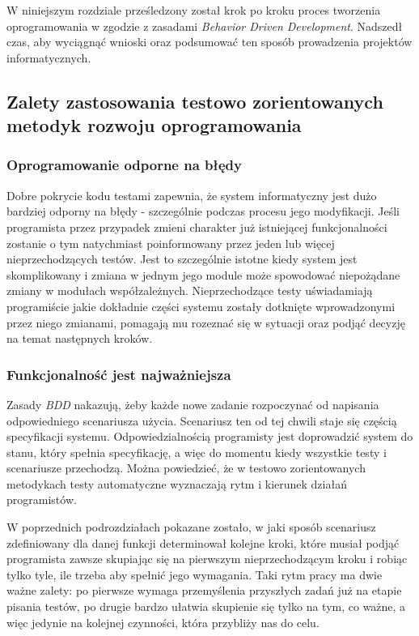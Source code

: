   W niniejszym rozdziale prześledzony został krok po kroku proces tworzenia oprogramowania w zgodzie z zasadami \emph{Behavior Driven Development}. Nadszedł czas, aby wyciągnąć wnioski oraz podsumować ten sposób prowadzenia projektów informatycznych.
  
  \subsection{Zalety zastosowania testowo zorientowanych metodyk rozwoju oprogramowania}
  
  \subsubsection{Oprogramowanie odporne na błędy}
    Dobre pokrycie kodu testami zapewnia, że system informatyczny jest dużo bardziej odporny na błędy - szczególnie podczas procesu jego modyfikacji. Jeśli programista przez przypadek zmieni charakter już istniejącej funkcjonalności zostanie o tym natychmiast poinformowany przez jeden lub więcej nieprzechodzących testów. Jest to szczególnie istotne kiedy system jest skomplikowany i zmiana w jednym jego module może spowodować niepożądane zmiany w modułach współzależnych. Nieprzechodzące testy uświadamiają programiście jakie dokładnie części systemu zostały dotknięte wprowadzonymi przez niego zmianami, pomagają mu rozeznać się w sytuacji oraz podjąć decyzję na temat następnych kroków.
    
  \subsubsection{Funkcjonalność jest najważniejsza}
  Zasady \emph{BDD} nakazują, żeby każde nowe zadanie rozpoczynać od napisania odpowiedniego scenariusza użycia. Scenariusz ten od tej chwili staje się częścią specyfikacji systemu. Odpowiedzialnością programisty jest doprowadzić system do stanu, który spełnia specyfikację, a więc do momentu kiedy wszystkie testy i scenariusze przechodzą. Można powiedzieć, że w testowo zorientowanych metodykach testy automatyczne wyznaczają rytm i kierunek działań programistów. 
    
  W poprzednich podrozdziałach pokazane zostało, w jaki sposób scenariusz zdefiniowany dla danej funkcji determinował kolejne kroki, które musiał podjąć programista zawsze skupiając się na pierwszym nieprzechodzącym kroku i robiąc tylko tyle, ile trzeba aby spełnić jego wymagania. Taki rytm pracy ma dwie ważne zalety: po pierwsze wymaga przemyślenia przyszłych zadań już na etapie pisania testów, po drugie bardzo ułatwia skupienie się tylko na tym, co ważne, a więc jedynie na kolejnej czynności, która przybliży nas do celu.
    
